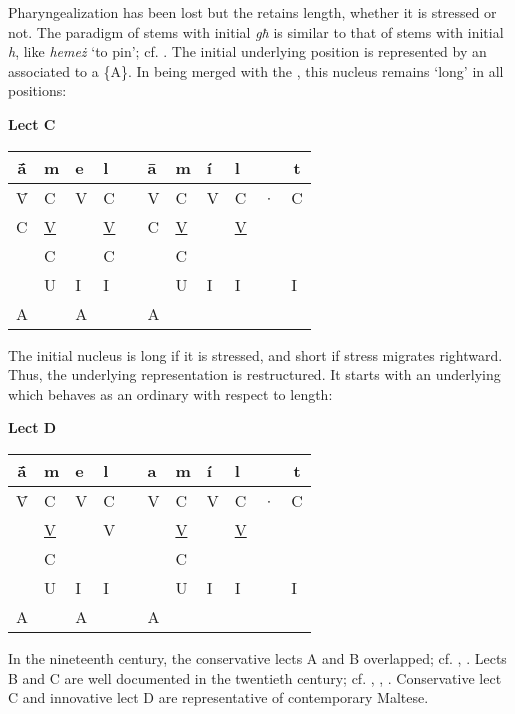 \documentclass[output=paper]{langsci/langscibook}
\begin{document}
 
Pharyngealization has been lost but the  retains length, whether it is stressed or not. The paradigm of stems with initial \textit{għ} is similar to that of stems with initial \textit{h}, like \textit{hemeż} ‘to pin’; cf. \citet[19]{Camilleri2014}. The initial underlying position is represented by an  associated to a   \{A\}. In being merged with the , this nucleus remains ‘long’ in all positions: 

  
\ea%
\textbf{Lect C}   \\
\begin{tabular}{|llll p{1cm} llllll|}
\multicolumn{1}{c}{ā́}&m	&	e	&	l	&&	ā	&	m	&	í	&	l	&		&\multicolumn{1}{c}{t} \\
\hline
\={V}	&	C	&	V	&	C	&&	V	&	C	&	V	&	C	&	·	&	C\\
C	&\underline{V}	&		&\underline{V}	&&	C	&	\underline{V}	&		&	\underline{V}	&		&	\\
	&	C	&		&	C	&&		&	C	&		&		&		&	\\
	&	U	&	I	&	I	&&		&	U	&	I	&	I	&		&	I\\
A	&		&	A	&		&&	A	&		&		&		&		&	\\
\hline
\end{tabular}
\z


The initial nucleus is long if it is stressed, and short if stress migrates rightward. Thus, the underlying representation is restructured. It starts with an underlying  which behaves as an ordinary  with respect to length:

\ea%
\textbf{Lect D}       \\
\begin{tabular}{|llll p{1cm} llllll|}
\multicolumn{1}{c}{ā́}&m	&	e	&	l	&&	a	&	m	&	í	&	l	&		&\multicolumn{1}{c}{t}\\
\hline
\={V}	&	C	&	V	&	C	&&	V	&	C	&	V	&	C	&	·	&	C\\
	&\underline{V}	&		&	V	&&		&\underline{V}	&		&\underline{V}	&		&	\\
	&	C	&		&		&&		&	C	&		&		&		&	\\
	&	U	&	I	&	I	&&		&	U	&	I	&	I	&		&	I\\
A	&		&	A	&		&&	A	&		&		&		&		&	\\
\hline
\end{tabular}
\z

In the nineteenth century, the conservative lects A and B overlapped; cf. \citet{Bonelli1897,Bonelli1898,Bonelli1900}, \citet{Stumme1904}. Lects B and C are well documented in the twentieth century; cf. \citet{Aquilina1959}, \citet{Schabert1976}, \citet{Vanhove1991}. Conservative lect C and innovative lect D are representative of contemporary Maltese.
\end{document}
